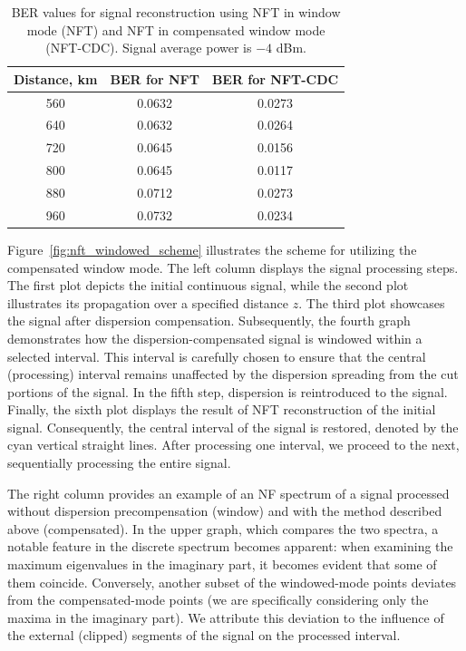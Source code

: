 \begin{table}[h!]
\centering
\begin{tabular}{|c|c|c|}
\hline Distance, km & BER for NFT & BER for NFT-CDC \\
\hline 560 & 0.0632 & 0.0273 \\
\hline 640 & 0.0632 & 0.0264 \\
\hline 720 & 0.0645 & 0.0156 \\
\hline 800 & 0.0645 & 0.0117 \\
\hline 880 & 0.0712 & 0.0273 \\
\hline 960 & 0.0732 & 0.0234 \\
\hline
\end{tabular}
\caption{BER values for signal reconstruction using NFT in window mode (NFT) and NFT in compensated window mode (NFT-CDC). Signal average power is $-4$ dBm.}
\label{tab:ber_nft_cdc}
\end{table}



Figure~\ref{fig:nft_windowed_scheme} illustrates the scheme for utilizing the compensated window mode. The left column displays the signal processing steps. The first plot depicts the initial continuous signal, while the second plot illustrates its propagation over a specified distance $z$. The third plot showcases the signal after dispersion compensation. Subsequently, the fourth graph demonstrates how the dispersion-compensated signal is windowed within a selected interval. This interval is carefully chosen to ensure that the central (processing) interval remains unaffected by the dispersion spreading from the cut portions of the signal. In the fifth step, dispersion is reintroduced to the signal. Finally, the sixth plot displays the result of NFT reconstruction of the initial signal. Consequently, the central interval of the signal is restored, denoted by the cyan vertical straight lines. After processing one interval, we proceed to the next, sequentially processing the entire signal.

The right column provides an example of an NF spectrum of a signal processed without dispersion precompensation (window) and with the method described above (compensated).
%
In the upper graph, which compares the two spectra, a notable feature in the discrete spectrum becomes apparent: when examining the maximum eigenvalues in the imaginary part, it becomes evident that some of them coincide. Conversely, another subset of the windowed-mode points deviates from the compensated-mode points (we are specifically considering only the maxima in the imaginary part). We attribute this deviation to the influence of the external (clipped) segments of the signal on the processed interval.

